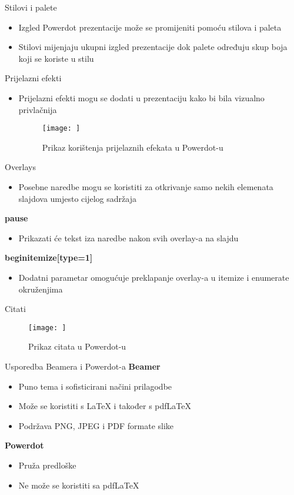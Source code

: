 \documentclass{beamer}
\begin{document}
\begin{frame}{Stilovi i palete}
\begin{itemize}
    \item Izgled Powerdot prezentacije može se promijeniti pomoću stilova i paleta
    \item Stilovi mijenjaju ukupni izgled prezentacije dok palete određuju skup boja koji se koriste u stilu
\end{itemize}
\end{frame}
\begin{frame}{Prijelazni efekti}
\begin{itemize}
    \item Prijelazni efekti mogu se dodati u prezentaciju kako bi bila vizualno privlačnija
\begin{figure}
	\texttt{[image: ]}
	\caption{Prikaz korištenja prijelaznih efekata u Powerdot-u}
\end{figure}
\end{itemize}
\end{frame}
\begin{frame}{Overlays}
 \begin{itemize}
    \item Posebne naredbe mogu se koristiti za otkrivanje samo nekih elemenata slajdova umjesto cijelog sadržaja
\end{itemize}
\textbf{pause}
\begin{itemize}
    \item Prikazati će tekst iza naredbe nakon svih overlay-a na slajdu 
\end{itemize}
\textbf{begin{itemize}[type=1]}
\begin{itemize}
    \item Dodatni parametar omogućuje preklapanje overlay-a u itemize i enumerate okruženjima
\end{itemize}
\end{frame}
\begin{frame}{Citati}
\begin{figure}
	\texttt{[image: ]}
	\caption{Prikaz citata u Powerdot-u}
\end{figure}   
\end{frame}
\begin{frame}{Usporedba Beamera i Powerdot-a}
\textbf{Beamer}
\begin{itemize}
    \item Puno tema i sofisticirani načini prilagodbe
    \item Može se koristiti s LaTeX i također s pdfLaTeX
    \item Podržava PNG, JPEG i PDF formate slike
\end{itemize}
\textbf{Powerdot}
\begin{itemize}
    \item Pruža predloške
    \item Ne može se koristiti sa pdfLaTeX
\end{itemize}
\end{frame}
\end{document}

